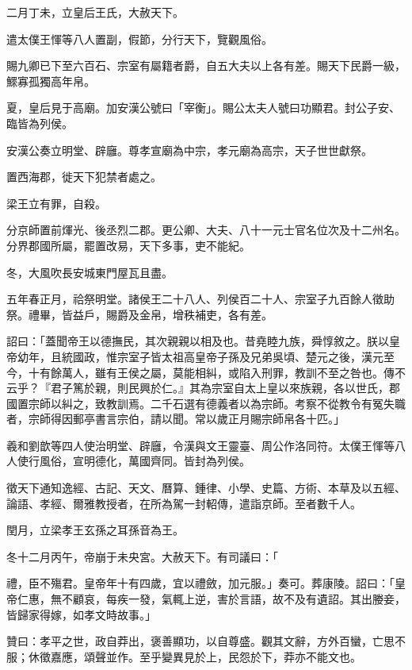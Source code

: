 \begin{pinyinscope}
二月丁未，立皇后王氏，大赦天下。

遣太僕王惲等八人置副，假節，分行天下，覽觀風俗。

賜九卿已下至六百石、宗室有屬籍者爵，自五大夫以上各有差。賜天下民爵一級，鰥寡孤獨高年帛。

夏，皇后見于高廟。加安漢公號曰「宰衡」。賜公太夫人號曰功顯君。封公子安、臨皆為列侯。

安漢公奏立明堂、辟廱。尊孝宣廟為中宗，孝元廟為高宗，天子世世獻祭。

置西海郡，徙天下犯禁者處之。

梁王立有罪，自殺。

分京師置前煇光、後丞烈二郡。更公卿、大夫、八十一元士官名位次及十二州名。分界郡國所屬，罷置改易，天下多事，吏不能紀。

冬，大風吹長安城東門屋瓦且盡。

五年春正月，祫祭明堂。諸侯王二十八人、列侯百二十人、宗室子九百餘人徵助祭。禮畢，皆益戶，賜爵及金帛，增秩補吏，各有差。

詔曰：「蓋聞帝王以德撫民，其次親親以相及也。昔堯睦九族，舜惇敘之。朕以皇帝幼年，且統國政，惟宗室子皆太祖高皇帝子孫及兄弟吳頃、楚元之後，漢元至今，十有餘萬人，雖有王侯之屬，莫能相糾，或陷入刑罪，教訓不至之咎也。傳不云乎？『君子篤於親，則民興於仁。』其為宗室自太上皇以來族親，各以世氏，郡國置宗師以糾之，致教訓焉。二千石選有德義者以為宗師。考察不從教令有冤失職者，宗師得因郵亭書言宗伯，請以聞。常以歲正月賜宗師帛各十匹。」

羲和劉歆等四人使治明堂、辟廱，令漢與文王靈臺、周公作洛同符。太僕王惲等八人使行風俗，宣明德化，萬國齊同。皆封為列侯。

徵天下通知逸經、古記、天文、曆算、鍾律、小學、史篇、方術、本草及以五經、論語、孝經、爾雅教授者，在所為駕一封軺傳，遣詣京師。至者數千人。

閏月，立梁孝王玄孫之耳孫音為王。

冬十二月丙午，帝崩于未央宮。大赦天下。有司議曰：「

禮，臣不殤君。皇帝年十有四歲，宜以禮斂，加元服。」奏可。葬康陵。詔曰：「皇帝仁惠，無不顧哀，每疾一發，氣輒上逆，害於言語，故不及有遺詔。其出媵妾，皆歸家得嫁，如孝文時故事。」

贊曰：孝平之世，政自莽出，褒善顯功，以自尊盛。觀其文辭，方外百蠻，亡思不服；休徵嘉應，頌聲並作。至乎變異見於上，民怨於下，莽亦不能文也。


\end{pinyinscope}